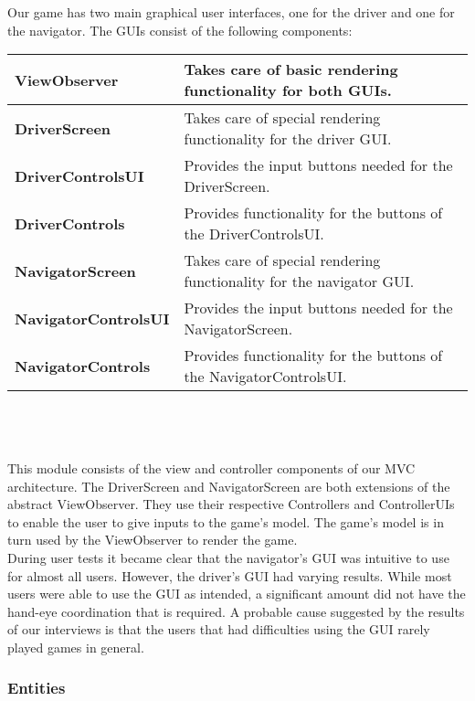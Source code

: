 {Our game has two main graphical user interfaces, one for the driver and one for the navigator. The GUIs consist of the following components:\\

\begin{tabular}{| l | l |} 
\hline
\textbf{ViewObserver} & Takes care of basic rendering functionality for both GUIs.\\ \hline
\textbf{DriverScreen} & Takes care of special rendering functionality for the driver GUI.\\ \hline
\textbf{DriverControlsUI} & Provides the input buttons needed for the DriverScreen.\\ \hline
\textbf{DriverControls} & Provides functionality for the buttons of the DriverControlsUI. \\ \hline
\textbf{NavigatorScreen} & Takes care of special rendering functionality for the navigator GUI. \\ \hline
\textbf{NavigatorControlsUI} & Provides the input buttons needed for the NavigatorScreen. \\ \hline
\textbf{NavigatorControls} & Provides functionality for the buttons of the NavigatorControlsUI. \\ \hline
\end{tabular}\\ \\ \\
This module consists of the view and controller components of our MVC architecture. The DriverScreen and NavigatorScreen are both extensions of the abstract ViewObserver. They use their respective Controllers and ControllerUIs to enable the user to give inputs to the game's model.  The game's model is in turn used by the ViewObserver to render the game. \\

During user tests it became clear that the navigator's GUI was intuitive to use for almost all users. However, the driver's GUI had varying results. While most users were able to use the GUI as intended, a significant amount did not have the hand-eye coordination that is required. A probable cause suggested by the results of our interviews is that the users that had difficulties using the GUI rarely played games in general.



\subsubsection{Entities}

}
